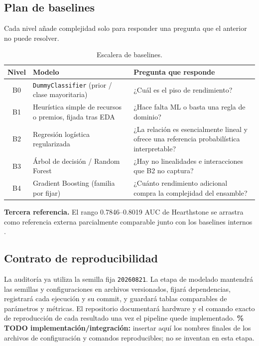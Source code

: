 \subsection{Plan de baselines}
\label{subsec:planbaselines}
Cada nivel añade complejidad solo para responder una pregunta que el
anterior no puede resolver.

\begin{table}[!t]
\centering
\caption{Escalera de baselines.}
\label{tab:baselines}
\footnotesize
\begin{tabularx}{\columnwidth}{@{}c P{2.4cm} Y@{}}
\toprule
\textbf{Nivel} & \textbf{Modelo} & \textbf{Pregunta que responde}\\
\midrule
B0 & \texttt{DummyClassifier} (prior / clase mayoritaria) & ¿Cuál es el piso de rendimiento?\\
B1 & Heurística simple de recursos o premios, fijada tras EDA & ¿Hace falta ML o basta una regla de dominio?\\
B2 & Regresión logística regularizada & ¿La relación es esencialmente lineal y ofrece una referencia probabilística interpretable?\\
B3 & Árbol de decisión / Random Forest & ¿Hay no linealidades e interacciones que B2 no captura?\\
B4 & Gradient Boosting (familia por fijar) & ¿Cuánto rendimiento adicional compra la complejidad del ensamble?\\
\bottomrule
\end{tabularx}
\end{table}

\noindent\textbf{Tercera referencia.} El rango 0.7846--0.8019 AUC de
Hearthstone se arrastra como referencia externa parcialmente comparable
junto con los baselines internos \cite{janusz_hearthstone_2017}.

\subsection{Contrato de reproducibilidad}
\label{subsec:reproducibilidad}
La auditoría ya utiliza la semilla fija \texttt{20260821}. La etapa de
modelado mantendrá las semillas y configuraciones en archivos
versionados, fijará dependencias, registrará cada ejecución y su commit,
y guardará tablas comparables de parámetros y métricas. El repositorio
documentará hardware y el comando exacto de reproducción de cada
resultado una vez el pipeline quede implementado. \textbf{\% TODO
implementación/integración:} insertar aquí los nombres finales de los
archivos de configuración y comandos reproducibles; no se inventan en
esta etapa.

